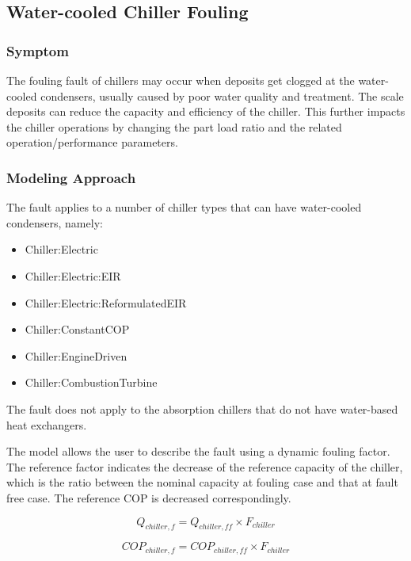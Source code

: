\subsection{Water-cooled Chiller Fouling}\label{water-cooled-chiller-fouling}

\subsubsection{Symptom}

The fouling fault of chillers may occur when deposits get clogged at the water-cooled condensers, usually caused by poor water quality and treatment. The scale deposits can reduce the capacity and efficiency of the chiller. This further impacts the chiller operations by changing the part load ratio and the related operation/performance parameters.

\subsubsection{Modeling Approach}

The fault applies to a number of chiller types that can have water-cooled condensers, namely:

\begin{itemize}
\tightlist
\item
  Chiller:Electric
\item
  Chiller:Electric:EIR
\item
  Chiller:Electric:ReformulatedEIR
\item
  Chiller:ConstantCOP
\item
  Chiller:EngineDriven
\item
  Chiller:CombustionTurbine
\end{itemize}

The fault does not apply to the absorption chillers that do not have water-based heat exchangers. 

The model allows the user to describe the fault using a dynamic fouling factor. The reference factor indicates the decrease of the reference capacity of the chiller, which is the ratio between the nominal capacity at fouling case and that at fault free case. The reference COP is decreased correspondingly.

\begin{equation}
Q_{chiller,f} = Q_{chiller,ff} \times F_{chiller}
\end{equation}

\begin{equation}
COP_{chiller,f} = COP_{chiller,ff} \times F_{chiller}
\end{equation}

